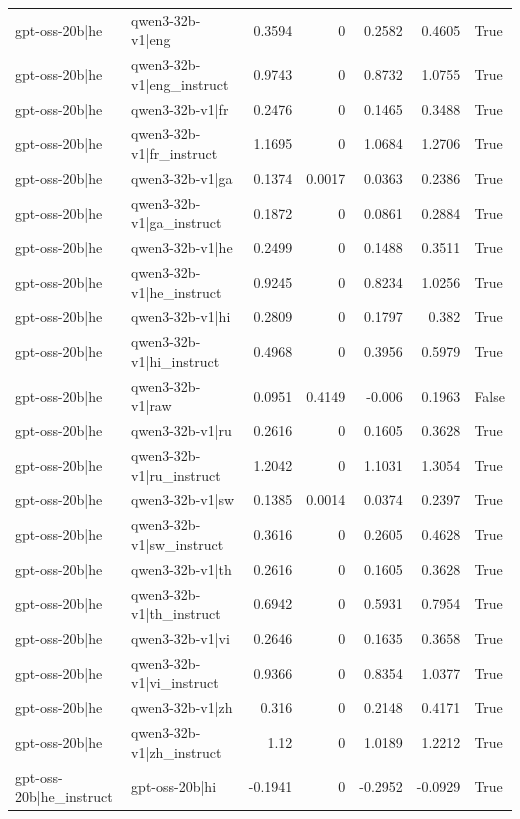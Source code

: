 \begin{table}
\begin{tabular}{l l r r r r l}
gpt-oss-20b|he & qwen3-32b-v1|eng & 0.3594 & 0 & 0.2582 & 0.4605 & True \\
gpt-oss-20b|he & qwen3-32b-v1|eng_instruct & 0.9743 & 0 & 0.8732 & 1.0755 & True \\
gpt-oss-20b|he & qwen3-32b-v1|fr & 0.2476 & 0 & 0.1465 & 0.3488 & True \\
gpt-oss-20b|he & qwen3-32b-v1|fr_instruct & 1.1695 & 0 & 1.0684 & 1.2706 & True \\
gpt-oss-20b|he & qwen3-32b-v1|ga & 0.1374 & 0.0017 & 0.0363 & 0.2386 & True \\
gpt-oss-20b|he & qwen3-32b-v1|ga_instruct & 0.1872 & 0 & 0.0861 & 0.2884 & True \\
gpt-oss-20b|he & qwen3-32b-v1|he & 0.2499 & 0 & 0.1488 & 0.3511 & True \\
gpt-oss-20b|he & qwen3-32b-v1|he_instruct & 0.9245 & 0 & 0.8234 & 1.0256 & True \\
gpt-oss-20b|he & qwen3-32b-v1|hi & 0.2809 & 0 & 0.1797 & 0.382 & True \\
gpt-oss-20b|he & qwen3-32b-v1|hi_instruct & 0.4968 & 0 & 0.3956 & 0.5979 & True \\
gpt-oss-20b|he & qwen3-32b-v1|raw & 0.0951 & 0.4149 & -0.006 & 0.1963 & False \\
gpt-oss-20b|he & qwen3-32b-v1|ru & 0.2616 & 0 & 0.1605 & 0.3628 & True \\
gpt-oss-20b|he & qwen3-32b-v1|ru_instruct & 1.2042 & 0 & 1.1031 & 1.3054 & True \\
gpt-oss-20b|he & qwen3-32b-v1|sw & 0.1385 & 0.0014 & 0.0374 & 0.2397 & True \\
gpt-oss-20b|he & qwen3-32b-v1|sw_instruct & 0.3616 & 0 & 0.2605 & 0.4628 & True \\
gpt-oss-20b|he & qwen3-32b-v1|th & 0.2616 & 0 & 0.1605 & 0.3628 & True \\
gpt-oss-20b|he & qwen3-32b-v1|th_instruct & 0.6942 & 0 & 0.5931 & 0.7954 & True \\
gpt-oss-20b|he & qwen3-32b-v1|vi & 0.2646 & 0 & 0.1635 & 0.3658 & True \\
gpt-oss-20b|he & qwen3-32b-v1|vi_instruct & 0.9366 & 0 & 0.8354 & 1.0377 & True \\
gpt-oss-20b|he & qwen3-32b-v1|zh & 0.316 & 0 & 0.2148 & 0.4171 & True \\
gpt-oss-20b|he & qwen3-32b-v1|zh_instruct & 1.12 & 0 & 1.0189 & 1.2212 & True \\
gpt-oss-20b|he_instruct & gpt-oss-20b|hi & -0.1941 & 0 & -0.2952 & -0.0929 & True \\

\end{tabular}
\end{table}
